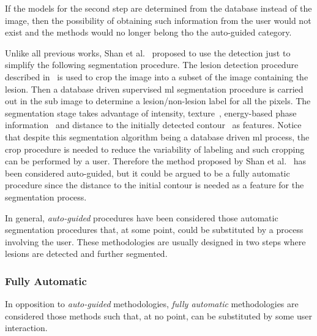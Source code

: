 \documentclass[authoryear,preprint,review,12pt]{elsarticle}
\begin{document}
If the models for the second step are determined from the database instead of the image, then the possibility of obtaining such information from the user would not exist and the methods would no longer belong tho the auto-guided category. 

Unlike all previous works, Shan et al.~\cite{Shan:2012p14347} proposed to use the detection just to simplify the following segmentation procedure. The lesion detection procedure described in~\cite{Shan:2008p10923} is used to crop the image into a subset of the image containing the lesion. Then a database driven supervised \ac{ml} segmentation procedure is carried out in the sub image to determine a lesion/non-lesion label for all the pixels. The segmentation stage takes advantage of intensity, texture~\cite{massich2010lesion}, energy-based phase information~\cite{kovesi1999image} and distance to the initially detected contour~\cite{Shan:2008p10923}  as features. Notice that despite this segmentation algorithm being a database driven \ac{ml} process, the crop procedure is needed to reduce the variability of labeling and such cropping can be performed by a user. Therefore the method proposed by Shan et al.~\cite{Shan:2012p14347} has been considered auto-guided, but it could be argued to be a fully automatic procedure since the distance to the initial contour is needed as a feature for the segmentation process.

In general, \emph{auto-guided} procedures have been considered those automatic segmentation procedures that, at some point, could be substituted by a process involving the user. These methodologies are usually designed in two steps where lesions are detected and further segmented.
 
\subsubsection{Fully Automatic}

In opposition to \emph{auto-guided} methodologies, \emph{fully automatic} methodologies are considered those methods such that, at no point, can be substituted by some user interaction. 
 
\end{document}
